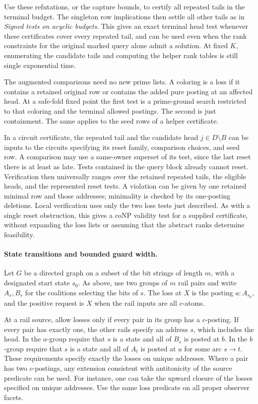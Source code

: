 Use these refutations, or the capture bounds,
to certify all repeated tails in the terminal
budget. The singleton row implications then
settle all other tails as in
\emph{Signed tests on acyclic budgets}. This
gives an exact terminal head test whenever
these certificates cover every repeated tail,
and can be used even when the rank constraints
for the original marked query alone admit a
solution. At fixed $K$, enumerating the candidate
tails and computing the helper rank tables is
still single exponential time.

The augmented comparisons need no new prime
lists. A coloring is a loss if it contains a
retained original row or contains the added
pure posting at an affected head. At a safe-fold
fixed point the first test is a prime-ground
search restricted to that coloring and the
terminal allowed postings. The second is just
containment. The same applies to the seed rows
of a helper certificate.

In a circuit certificate, the repeated tail
and the candidate head $j\in D\setminus B$
can be inputs to the circuits specifying its
reset family, comparison choices, and seed
row. A comparison may use a same-owner
superset of its test, since the last reset
there is at least as late. Tests contained in
the query block already cannot reset.
Verification then universally ranges over
the retained repeated tails, the eligible heads,
and the represented reset tests. A violation
can be given by one retained minimal row
and those addresses; minimality is checked
by its one-posting deletions. Local verification
uses only the two loss tests just described.
As with a single reset obstruction, this gives
a coNP validity test for a supplied certificate,
without expanding the loss lists or assuming
that the abstract ranks determine feasibility.

\paragraph{State transitions and bounded guard width.}
Let $G$ be a directed graph on a subset of the bit strings of length
$m$, with a designated start state $s_0$. As above, use two groups
of $m$ rail pairs and write $A_s,B_s$ for the coalitions selecting the
bits of $s$. The loss at $X$ is the posting $a:A_{s_0}$, and the
positive request is $X$ when the rail inputs are all $c$-atoms.

At a rail source, allow losses only if every pair in its group has a
$c$-posting. If every pair has exactly one, the other rails specify an
address $s$, which includes the head. In the $a$-group require that
$s$ is a state and all of $B_s$ is posted at $b$. In the $b$-group
require that $s$ is a state and all of $A_t$ is posted at $a$ for some
arc $s\to t$. These requirements specify exactly the losses on unique
addresses. Where a pair has two $c$-postings, any extension consistent
with antitonicity of the source predicate can be used. For instance,
one can take the upward closure of the losses specified on unique
addresses. Use the same loss predicate on all proper observer facets.

